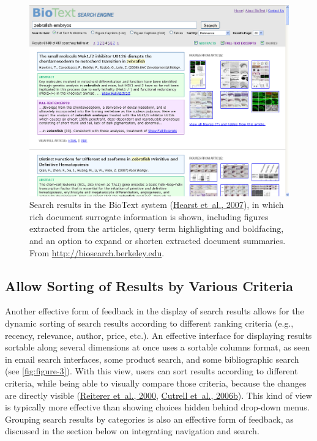 \documentclass[sigconf,nonacm,screen,pbalance]{acmart}
\begin{document}
\begin{figure}[ht]
    \includegraphics[width=\columnwidth]{./biotext3.png}
    \vspace{-20pt}
    \caption{Search results in the BioText system
        (\href{https://searchuserinterfaces.com/book/sui_references.html\#hearst2007bse}{Hearst et~al., 2007}),
        in which rich document surrogate information is shown, including figures extracted from the articles,
        query term highlighting and boldfacing, and an option to expand or shorten extracted document summaries.
        From \url{http://biosearch.berkeley.edu}.}
    \label{fig:figure-2}
    \vspace{-10pt}
\end{figure}

\subsection{Allow Sorting of Results by Various Criteria}

Another effective form of feedback in the display of search results allows for the dynamic sorting of
search results according to different ranking criteria (e.g., recency, relevance, author, price, etc.).
An effective interface for displaying results sortable along several dimensions at once uses a sortable
columns format, as seen in email search interfaces, some product search, and some bibliographic search
(see \autoref{fig:figure-3}). With this
view, users can sort results according to different criteria, while being able to visually compare those
criteria, because the changes are directly visible (\href{https://searchuserinterfaces.com/book/sui_references.html#reiterer2000iia}{Reiterer et~al., 2000}, \href{https://searchuserinterfaces.com/book/sui_references.html#cutrell2006fff}{ Cutrell et~al., 2006b}). This kind of view is
typically more effective than showing choices hidden behind drop-down menus. Grouping search results by
categories is also an effective form of feedback, as discussed in the section below on integrating
navigation and search.
\end{document}
